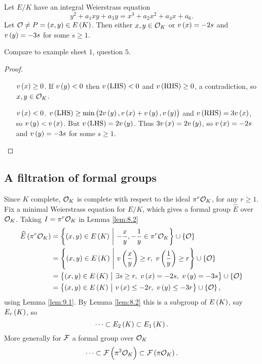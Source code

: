 \begin{lemma}
\label{lem:9.1}
Let $ E / K $ have an integral Weierstrass equation
$$ y^2 + a_1xy + a_3y = x^3 + a_2x^2 + a_4x + a_6. $$
Let $ \OOO \ne P = \br{x, y} \in E\br{K} $. Then either $ x, y \in \mathcal{O}_K $ or $ v\br{x} = -2s $ and $ v\br{y} = -3s $ for some $ s \ge 1 $.
\end{lemma}

Compare to example sheet $ 1 $, question $ 5 $.

\begin{proof}
\hfill
\begin{itemize}[leftmargin=0.5in]
\item[$ v\br{x} \ge 0 $.] If $ v\br{y} < 0 $ then $ v\br{\text{LHS}} < 0 $ and $ v\br{\text{RHS}} \ge 0 $, a contradiction, so $ x, y \in \mathcal{O}_K $.
\item[$ v\br{x} < 0 $.] $ v\br{\text{LHS}} \ge \min\br{2v\br{y}, v\br{x} + v\br{y}, v\br{y}} $ and $ v\br{\text{RHS}} = 3v\br{x} $, so $ v\br{y} < v\br{x} $. But $ v\br{\text{LHS}} = 2v\br{y} $. Thus $ 3v\br{x} = 2v\br{y} $, so $ v\br{x} = -2s $ and $ v\br{y} = -3s $ for some $ s \ge 1 $.
\end{itemize}
\end{proof}

\subsection{A filtration of formal groups}

Since $ K $ complete, $ \mathcal{O}_K $ is complete with respect to the ideal $ \pi^r\mathcal{O}_K $, for any $ r \ge 1 $. Fix a minimal Weierstrass equation for $ E / K $, which gives a formal group $ \widehat{E} $ over $ \mathcal{O}_K $. Taking $ I = \pi^r\mathcal{O}_K $ in Lemma \ref{lem:8.2}
\begin{align*}
\widehat{E}\br{\pi^r\OOO_K}
& = \cbr{\br{x, y} \in E\br{K} \st -\dfrac{x}{y}, -\dfrac{1}{y} \in \pi^r\OOO_K} \cup \cbr{\OOO} \\
& = \cbr{\br{x, y} \in E\br{K} \st v\br{\dfrac{x}{y}} \ge r, \ v\br{\dfrac{1}{y}} \ge r} \cup \cbr{\OOO} \\
& = \cbr{\br{x, y} \in E\br{K} \st \exists s \ge r, \ v\br{x} = -2s, \ v\br{y} = -3s} \cup \cbr{\OOO} \\
& = \cbr{\br{x, y} \in E\br{K} \st v\br{x} \le -2r, \ v\br{y} \le -3r} \cup \cbr{\OOO},
\end{align*}
using Lemma \ref{lem:9.1}. By Lemma \ref{lem:8.2} this is a subgroup of $ E\br{K} $, say $ E_r\br{K} $, so
$$ \dots \subset E_2\br{K} \subset E_1\br{K}. $$
More generally for $ \mathcal{F} $ a formal group over $ \mathcal{O}_K $
$$ \dots \subset \FFF\br{\pi^2\OOO_K} \subset \FFF\br{\pi\OOO_K}. $$

